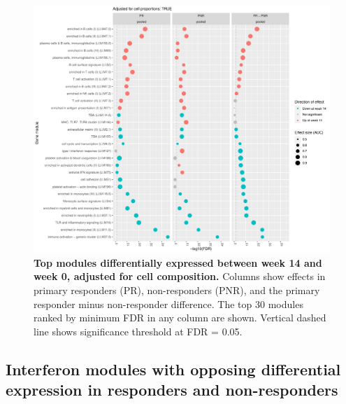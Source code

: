 \begin{figure}
    \centering
    \includegraphics[width=1.0\textwidth,page=1]{mainmatter/figures/chapter_04/plot_gene_set_enrichment.tmodCERNO_panelplot_reversed_C_3R_1R,C_3N_1N,C_(3R_1R)_(3N_1N).cell_prop_correction_TRUE.pdf}
    \caption{
        \textbf{Top modules differentially expressed between week 14 and week 0, adjusted for cell composition.}
        Columns show effects in primary responders (PR), non-responders (PNR), and the primary responder minus non-responder difference. 
        The top 30 modules ranked by minimum \gls{FDR} in any column are shown. 
        Vertical dashed line shows significance threshold at FDR = 0.05.
    }
    \label{fig:multipants_dge_panelPlot_week_14_0_R_N_cellPropT}
\end{figure}

\subsection{Interferon modules with opposing differential expression in responders and non-responders}
\label{subsec:multipants_dge_opposing_interferon}

